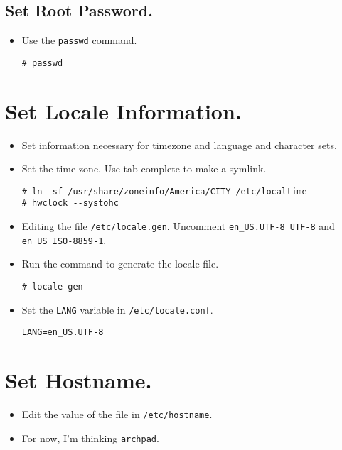 \documentclass{article}
\begin{document}
\subsection{Set Root Password.}
  \begin{itemize}
    \item Use the \verb|passwd| command.
\begin{verbatim}
# passwd
\end{verbatim}
  \end{itemize}

\section{Set Locale Information.}
  \begin{itemize}
    \item Set information necessary for timezone and language and character
      sets.
    \item Set the time zone. Use tab complete to make a symlink.
\begin{verbatim}
# ln -sf /usr/share/zoneinfo/America/CITY /etc/localtime
# hwclock --systohc
\end{verbatim}
    \item Editing the file \verb|/etc/locale.gen|. Uncomment
      \verb|en_US.UTF-8 UTF-8| and \verb|en_US ISO-8859-1|.
    \item Run the command to generate the locale file.
\begin{verbatim}
# locale-gen
\end{verbatim}
    \item Set the \verb|LANG| variable in \verb|/etc/locale.conf|.
\begin{verbatim}
LANG=en_US.UTF-8
\end{verbatim}
  \end{itemize}

\section{Set Hostname.}
  \begin{itemize}
    \item Edit the value of the file in \verb|/etc/hostname|.
    \item For now, I'm thinking \verb|archpad|.
  \end{itemize}
\end{document}
